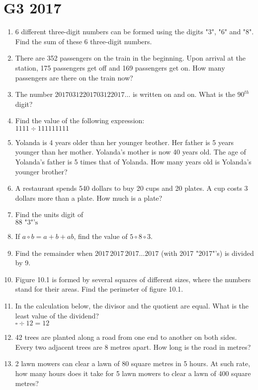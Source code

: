 \documentclass[11pt]{scrartcl}
\begin{document}
\section{G3 2017}
\begin{enumerate}
    \item 6 different three-digit numbers can be formed using the digits "3", "6" and "8". Find the sum of these 6 three-digit numbers.
    \item There are 352 passengers on the train in the beginning. Upon arrival at the station, 175 passengers get off and 169 passengers get on. How many passengers are there on the train now?
    \item The number $20170312201703122017\ldots$ is written on and on. What is the $90^{th}$ digit?
    \item Find the value of the following expression: \\
        $1111 \div 111111111$
    \item Yolanda is 4 years older than her younger brother. Her father is 5 years younger than her mother. Yolanda's mother is now 40 years old. The age of Yolanda's father is 5 times that of Yolanda. How many years old is Yolanda's younger brother?
    \item A restaurant spends 540 dollars to buy 20 cups and 20 plates. A cup costs 3 dollars more than a plate. How much is a plate?
    \item Find the units digit of \\
        $88 \text{ "3"'s}$
    \item If $a \circ b = a + b + ab$, find the value of $5 \circ 8 \circ 3$.
    \item Find the remainder when $2017\,2017\,2017\ldots2017$ (with 2017 "2017"'s) is divided by 9.
    \item Figure 10.1 is formed by several squares of different sizes, where the numbers stand for their areas. Find the perimeter of figure 10.1.
    \item In the calculation below, the divisor and the quotient are equal. What is the least value of the dividend? \\
        $\square \div 12 = 12$
    \item 42 trees are planted along a road from one end to another on both sides. Every two adjacent trees are 8 metres apart. How long is the road in metres?
    \item 2 lawn mowers can clear a lawn of 80 square metres in 5 hours. At such rate, how many hours does it take for 5 lawn mowers to clear a lawn of 400 square metres?

\end{enumerate}
\end{document}
